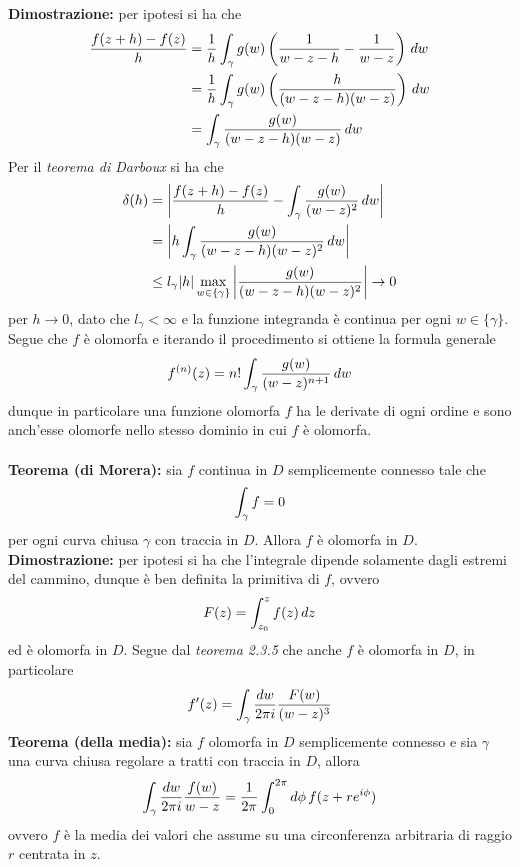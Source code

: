 \documentclass{article}
\begin{document}
\textbf{Dimostrazione:} per ipotesi si ha che
\begin{align}
    \frac{f(z + h) - f(z)}{h} &= \frac{1}{h}\int_\gamma g(w)\left(\frac{1}{w - z - h} - \frac{1}{w - z}\right) \, dw \notag \\
    &= \frac{1}{h}\int_\gamma g(w)\left(\frac{h}{(w - z - h)(w - z)}\right) \, dw \notag \\
    &= \int_\gamma\frac{g(w)}{(w - z - h)(w - z)} \, dw \notag
\end{align}
Per il \textit{teorema di Darboux} si ha che
\begin{align}
    \delta(h) &= \left|\frac{f(z + h) - f(z)}{h} - \int_\gamma\frac{g(w)}{(w - z)^2} \, dw\right| \notag \\
    &= \left|h\int_\gamma\frac{g(w)}{(w - z - h)(w - z)^2} \, dw\right| \notag \\
    &\leq l_\gamma|h|\max_{w \in \{\gamma\}}\left|\frac{g(w)}{(w - z - h)(w - z)^2}\right| \rightarrow 0 \notag
\end{align}
per $h \rightarrow 0$, dato che $l_\gamma < \infty$ e la funzione integranda è continua per ogni $w \in \{\gamma\}$. Segue che $f$ è olomorfa e iterando il procedimento si ottiene la formula generale
\begin{gather}
    f^{(n)}(z) = n!\int_\gamma\frac{g(w)}{(w - z)^{n + 1}} \, dw \notag
\end{gather}
dunque in particolare una funzione olomorfa $f$ ha le derivate di ogni ordine e sono anch'esse olomorfe nello stesso dominio in cui $f$ è olomorfa. \\ \\
\textbf{Teorema (di Morera):} sia $f$ continua in $D$ semplicemente connesso tale che
\begin{gather}
    \int_\gamma f = 0 \notag
\end{gather}
per ogni curva chiusa $\gamma$ con traccia in $D$. Allora $f$ è olomorfa in $D$. \\

\textbf{Dimostrazione:} per ipotesi si ha che l'integrale dipende solamente dagli estremi del cammino, dunque è ben definita la primitiva di $f$, ovvero
\begin{gather}
    F(z) = \int_{z_0}^zf(z) \, dz \notag
\end{gather}
ed è olomorfa in $D$. Segue dal \textit{teorema 2.3.5} che anche $f$ è olomorfa in $D$, in particolare
\begin{gather}
    f'(z) = \int_\gamma\frac{dw}{2\pi i}\frac{F(w)}{(w - z)^3} \notag
\end{gather}
\textbf{Teorema (della media):} sia $f$ olomorfa in $D$ semplicemente connesso e sia $\gamma$ una curva chiusa regolare a tratti con traccia in $D$, allora
\begin{gather}
    \int_\gamma\frac{dw}{2\pi i}\frac{f(w)}{w - z} = \frac{1}{2\pi}\int_0^{2\pi}d\phi \, f(z + re^{i\phi}) \notag
\end{gather}
ovvero $f$ è la media dei valori che assume su una circonferenza arbitraria di raggio $r$ centrata in $z$. \\
\end{document}
